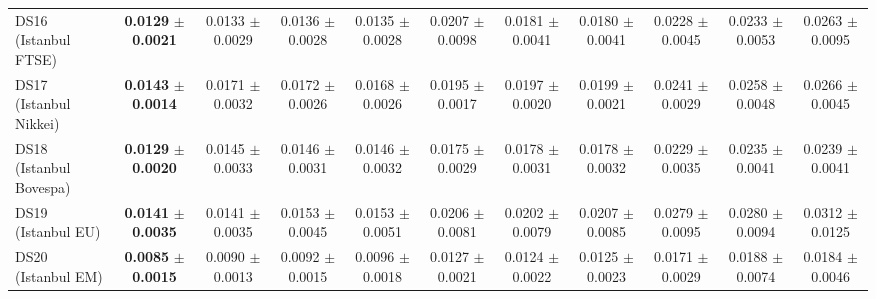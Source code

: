 \begin{table}[t]
{{\begin{tabular}{lcccccccccc}
DS16 (Istanbul FTSE) & \textbf{0.0129} $\pm$ \textbf{0.0021} & 0.0133 $\pm$ 0.0029 & 0.0136 $\pm$ 0.0028 & 0.0135 $\pm$ 0.0028 & 0.0207 $\pm$ 0.0098 & 0.0181 $\pm$ 0.0041 & 0.0180 $\pm$ 0.0041 & 0.0228 $\pm$ 0.0045 & 0.0233 $\pm$ 0.0053 & 0.0263 $\pm$ 0.0095 \\
DS17 (Istanbul Nikkei) & \textbf{0.0143} $\pm$ \textbf{0.0014} & 0.0171 $\pm$ 0.0032 & 0.0172 $\pm$ 0.0026 & 0.0168 $\pm$ 0.0026 & 0.0195 $\pm$ 0.0017 & 0.0197 $\pm$ 0.0020 & 0.0199 $\pm$ 0.0021 & 0.0241 $\pm$ 0.0029 & 0.0258 $\pm$ 0.0048 & 0.0266 $\pm$ 0.0045 \\
DS18 (Istanbul Bovespa) & \textbf{0.0129} $\pm$ \textbf{0.0020} & 0.0145 $\pm$ 0.0033 & 0.0146 $\pm$ 0.0031 & 0.0146 $\pm$ 0.0032 & 0.0175 $\pm$ 0.0029 & 0.0178 $\pm$ 0.0031 & 0.0178 $\pm$ 0.0032 & 0.0229 $\pm$ 0.0035 & 0.0235 $\pm$ 0.0041 & 0.0239 $\pm$ 0.0041 \\
DS19 (Istanbul EU) & \textbf{0.0141} $\pm$ \textbf{0.0035} & 0.0141 $\pm$ 0.0035 & 0.0153 $\pm$ 0.0045 & 0.0153 $\pm$ 0.0051 & 0.0206 $\pm$ 0.0081 & 0.0202 $\pm$ 0.0079 & 0.0207 $\pm$ 0.0085 & 0.0279 $\pm$ 0.0095 & 0.0280 $\pm$ 0.0094 & 0.0312 $\pm$ 0.0125 \\
DS20 (Istanbul EM) & \textbf{0.0085} $\pm$ \textbf{0.0015} & 0.0090 $\pm$ 0.0013 & 0.0092 $\pm$ 0.0015 & 0.0096 $\pm$ 0.0018 & 0.0127 $\pm$ 0.0021 & 0.0124 $\pm$ 0.0022 & 0.0125 $\pm$ 0.0023 & 0.0171 $\pm$ 0.0029 & 0.0188 $\pm$ 0.0074 & 0.0184 $\pm$ 0.0046 \\
\bottomrule
\end{tabular}%
}%
}
\end{table}
